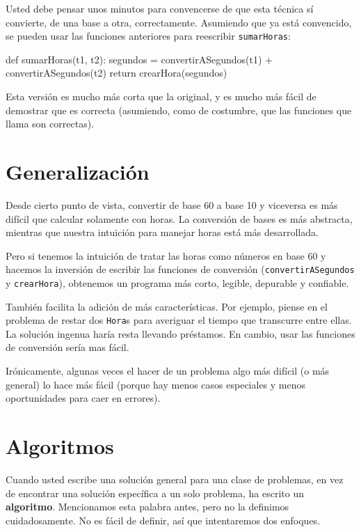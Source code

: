 Usted debe pensar unos minutos para convencerse de que esta técnica
sí convierte, de una base a otra, correctamente. Asumiendo que ya
está convencido, se pueden usar las funciones anteriores para reescribir
\texttt{sumarHoras}:

\begin{pythoncode}
def sumarHoras(t1, t2):
  segundos = convertirASegundos(t1) + convertirASegundos(t2)
  return crearHora(segundos)
\end{pythoncode}
 Esta versión es mucho más corta que la original, y es mucho más fácil
de demostrar que es correcta (asumiendo, como de costumbre, que las
funciones que llama son correctas).

\section{Generalización}


Desde cierto punto de vista, convertir de base 60 a base 10 y viceversa
es más difícil que calcular solamente con horas. La conversión de
bases es más abstracta, mientras que nuestra intuición para manejar
horas está más desarrollada.

Pero si tenemos la intuición de tratar las horas como números en base
60 y hacemos la inversión de escribir las funciones de conversión
(\texttt{convertirASegundos} y \texttt{crearHora}), obtenemos un programa
más corto, legible, depurable y confiable.

También facilita la adición de más características. Por ejemplo, piense
en el problema de restar dos \texttt{Hora}s para averiguar el tiempo
que transcurre entre ellas. La solución ingenua haría resta llevando
préstamos. En cambio, usar las funciones de conversión sería mas fácil.

Irónicamente, algunas veces el hacer de un problema algo más difícil
(o más general) lo hace más fácil (porque hay menos casos especiales
y menos oportunidades para caer en errores).

\section{Algoritmos}


Cuando usted escribe una solución general para una clase de problemas,
en vez de encontrar una solución específica a un solo problema, ha
escrito un \textbf{algoritmo}. Mencionamos esta palabra antes, pero
no la definimos cuidadosamente. No es fácil de definir, así que intentaremos
dos enfoques.

